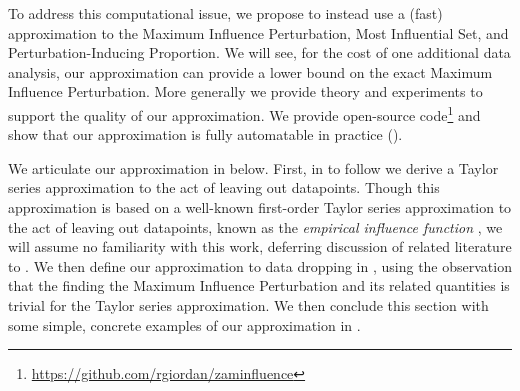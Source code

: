 To address this computational issue, we propose to instead use a (fast)
approximation to the Maximum Influence Perturbation, Most Influential Set, and
Perturbation-Inducing Proportion. We will see, for the cost of one additional
data analysis, our approximation can provide a lower bound on the exact Maximum
Influence Perturbation. More generally we provide theory and experiments to
support the quality of our approximation. We provide open-source
code\footnote{\url{https://github.com/rgiordan/zaminfluence}} and show that our
approximation is fully automatable in practice ().

We articulate our approximation in  below.  First, in
 to follow we derive a Taylor series approximation to the
act of leaving out datapoints.  Though this approximation is based on a
well-known first-order Taylor series approximation to the act of leaving out
datapoints, known as the {\em empirical influence function}
\citep{hampel1974influence,hampel1986robustbook}, we will assume no familiarity
with this work, deferring discussion of related literature to
.  We then define our approximation to
data dropping in , using the observation that the finding the
Maximum Influence Perturbation and its related quantities is trivial for the
Taylor series approximation.  We then conclude this section with some simple,
concrete examples of our approximation in
.

